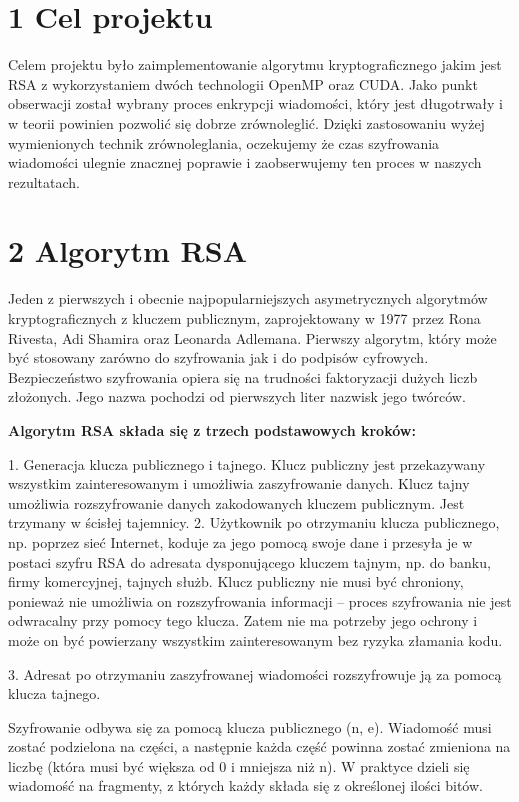 \documentclass[a4paper,12pt]{article}
\begin{document}
\section*{1 Cel projektu}

Celem projektu było zaimplementowanie algorytmu kryptograficznego jakim jest RSA z wykorzystaniem dwóch technologii OpenMP oraz CUDA. Jako punkt obserwacji został wybrany proces enkrypcji wiadomości, który jest długotrwały i w teorii powinien pozwolić się dobrze zrównoleglić. Dzięki zastosowaniu wyżej wymienionych technik zrównoleglania, oczekujemy że czas szyfrowania wiadomości ulegnie znacznej poprawie i zaobserwujemy ten proces w naszych rezultatach.

\section*{2 Algorytm RSA}

Jeden z pierwszych i obecnie najpopularniejszych asymetrycznych algorytmów kryptograficznych z kluczem publicznym, zaprojektowany w 1977 przez Rona Rivesta, Adi Shamira oraz Leonarda Adlemana. Pierwszy algorytm, który może być stosowany zarówno do szyfrowania jak i do podpisów cyfrowych. Bezpieczeństwo szyfrowania opiera się na trudności faktoryzacji dużych liczb złożonych. Jego nazwa pochodzi od pierwszych liter nazwisk jego twórców.

\textbf{Algorytm RSA składa się z trzech podstawowych kroków:}

1. Generacja klucza publicznego i tajnego. Klucz publiczny jest przekazywany wszystkim zainteresowanym i umożliwia zaszyfrowanie danych. Klucz tajny umożliwia rozszyfrowanie danych zakodowanych kluczem publicznym. Jest trzymany w ścisłej tajemnicy.
2. Użytkownik po otrzymaniu klucza publicznego, np. poprzez sieć Internet, koduje za jego pomocą swoje dane i przesyła je w postaci szyfru RSA do adresata dysponującego kluczem tajnym, np. do banku, firmy komercyjnej, tajnych służb. Klucz publiczny nie musi być chroniony, ponieważ nie umożliwia on rozszyfrowania informacji – proces szyfrowania nie jest odwracalny przy pomocy tego klucza. Zatem nie ma potrzeby jego ochrony i może on być powierzany wszystkim zainteresowanym bez ryzyka złamania kodu.

3. Adresat po otrzymaniu zaszyfrowanej wiadomości rozszyfrowuje ją za pomocą klucza tajnego.

Szyfrowanie odbywa się za pomocą klucza publicznego (n, e). Wiadomość musi zostać podzielona na części, a następnie każda część powinna zostać zmieniona na liczbę (która musi być większa od 0 i mniejsza niż n). W praktyce dzieli się wiadomość na fragmenty, z których każdy składa się z określonej ilości bitów.
\end{document}
